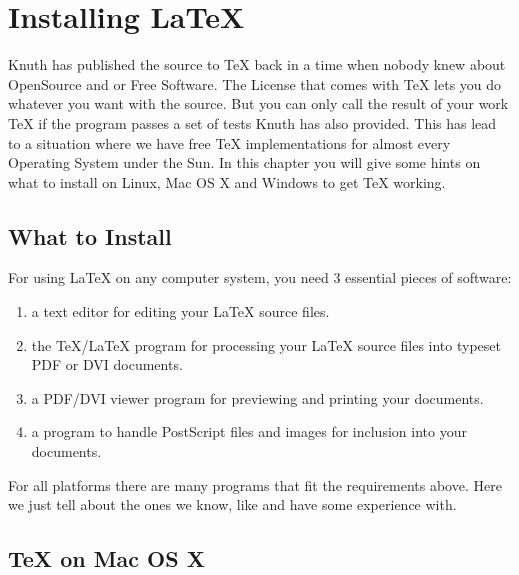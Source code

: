 \documentclass[11pt,a4paper,twoside]{book}
\begin{document}
\frontmatter
\tableofcontents
\mainmatter

\chapter{Installing LaTeX}
\begin{intro}
Knuth has published the source to \TeX{} back in a time when nobody knew
about OpenSource and or Free Software. The License that comes with \TeX{}
lets you do whatever you want with the source. But you can only call the
result of your work \TeX{} if the program passes a set of tests Knuth has
also provided. This has lead to a situation where we have free \TeX{}
implementations for almost every Operating System under the Sun. In this chapter
you will give some hints on what to install on Linux, Mac OS X and Windows to
get \TeX{} working.
\end{intro}

\section{What to Install}

For using LaTeX on any computer system, you need 3 essential pieces of
software:

\begin{enumerate}

\item a text editor for editing your LaTeX source files.

\item the \TeX{}/\LaTeX{} program for processing your \LaTeX{} source files
into typeset PDF or DVI documents.

\item a PDF/DVI viewer program for previewing and printing your
documents.

\item a program to handle PostScript files and images for inclusion into
your documents.

\end{enumerate}

For all platforms there are many programs that fit the requirements above.
Here we just tell about the ones we know, like and have some experience
with.

\section{\TeX{} on Mac OS X}
\end{document}
